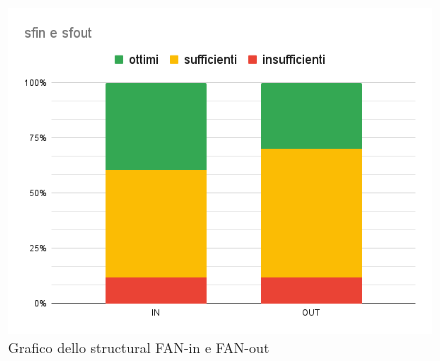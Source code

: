         \begin{figure}[H]
            \centering
            \includegraphics[width=13 cm]{source/sections/images/SfinSfout.png}
            \caption{Grafico dello structural FAN-in e FAN-out}
        \end{figure}
